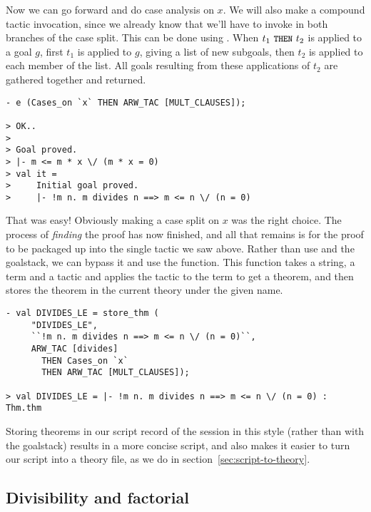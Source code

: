 Now we can go forward and do case analysis on $x$. We will
    also make a compound tactic invocation, since we already know that
    we'll have to invoke  in both branches of the case
    split. This can be done using .  When $t_1 \
    \mbox{\ml{THEN}}\ t_2$ is applied to a goal $g$, first $t_1$ is
    applied to $g$, giving a list of new subgoals, then $t_2$ is
    applied to each member of the list. All goals resulting from these
    applications of $t_2$ are gathered together and returned.
\begin{session}\begin{verbatim}
- e (Cases_on `x` THEN ARW_TAC [MULT_CLAUSES]);

> OK..
>
> Goal proved.
> |- m <= m * x \/ (m * x = 0)
> val it =
>     Initial goal proved.
>     |- !m n. m divides n ==> m <= n \/ (n = 0)
\end{verbatim}\end{session}
    That was easy! Obviously making a case split on $x$ was the right
    choice. The process of {\it finding\/} the proof has now finished,
    and all that remains is for the proof to be packaged up into the
    single tactic we saw above.  Rather than use \ml{top\_thm} and the
    goalstack, we can bypass it and use the \ml{store\_thm} function.
    This function takes a string, a term and a tactic and applies the
    tactic to the term to get a theorem, and then stores the theorem
    in the current theory under the given name.
\begin{session}\begin{verbatim}
- val DIVIDES_LE = store_thm (
     "DIVIDES_LE",
     ``!m n. m divides n ==> m <= n \/ (n = 0)``,
     ARW_TAC [divides]
       THEN Cases_on `x`
       THEN ARW_TAC [MULT_CLAUSES]);

> val DIVIDES_LE = |- !m n. m divides n ==> m <= n \/ (n = 0) : Thm.thm
\end{verbatim}\end{session}
    Storing theorems in our script record of the session in this style
    (rather than with the goalstack) results in a more concise script,
    and also makes it easier to turn our script into a theory file, as
    we do in section~\ref{sec:script-to-theory}.

\subsection{Divisibility and factorial}

